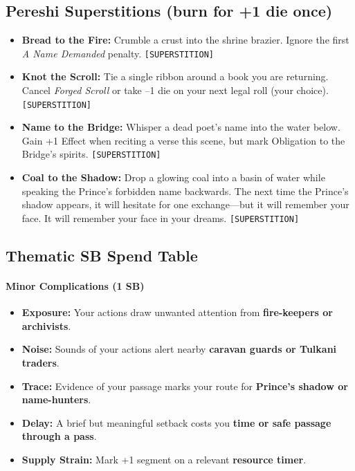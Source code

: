 \subsection*{Pereshi Superstitions (burn for +1 die once)}
\begin{itemize}
  \item \textbf{Bread to the Fire:} Crumble a crust into the shrine brazier. Ignore the first \emph{A Name Demanded} penalty. \hfill \texttt{[SUPERSTITION]}
  \item \textbf{Knot the Scroll:} Tie a single ribbon around a book you are returning. Cancel \emph{Forged Scroll} or take --1 die on your next legal roll (your choice). \hfill \texttt{[SUPERSTITION]}
  \item \textbf{Name to the Bridge:} Whisper a dead poet's name into the water below. Gain +1 Effect when reciting a verse this scene, but mark Obligation to the Bridge's spirits. \hfill \texttt{[SUPERSTITION]}
  \item \textbf{Coal to the Shadow:} Drop a glowing coal into a basin of water while speaking the Prince's forbidden name backwards. The next time the Prince's shadow appears, it will hesitate for one exchange---but it will remember your face. It will remember your face in your dreams. \hfill \texttt{[SUPERSTITION]}
\end{itemize}

\subsection*{Thematic SB Spend Table}
\label{sec:pereshi-sb}

\paragraph{Minor Complications (1 SB)}
\begin{itemize}
\item \textbf{Exposure:} Your actions draw unwanted attention from \textbf{fire-keepers or archivists}.
\item \textbf{Noise:} Sounds of your actions alert nearby \textbf{caravan guards or Tulkani traders}.
\item \textbf{Trace:} Evidence of your passage marks your route for \textbf{Prince's shadow or name-hunters}.
\item \textbf{Delay:} A brief but meaningful setback costs you \textbf{time or safe passage through a pass}.
\item \textbf{Supply Strain:} Mark +1 segment on a relevant \textbf{resource timer}.
\end{itemize}

